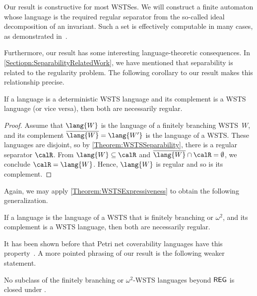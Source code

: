 \documentclass[../../diss.tex]{subfiles}
\begin{document}
Our result is constructive for most WSTSes.
We will construct a finite automaton whose language is the required regular separator from the so-called ideal decomposition of an invariant.
Such a set is effectively computable in many cases, as demonstrated \eg in~\cite{Finkel16,LazicS15}.

Furthermore, our result has some interesting language-theoretic consequences.
In \cref{Sectiopn:SeparabilityRelatedWork}, we have mentioned that separability is related to the regularity problem.
The following corollary to our result makes this relationship precise.

\begin{corollary}%
\label{Corollary:WSTSNecessarilyRegular}%
    If a language is a deterministic WSTS language and its complement is a WSTS language (or vice versa), then both are necessarily regular.
\end{corollary}

\begin{proof}
    Assume that $\lang{\wsts}$ is the language of a finitely branching WSTS~$W$, and its complement $\overline{\lang{\wsts}} = \lang{\wstsprime}$ is the language of a WSTS.\@
    These languages are disjoint, so by \cref{Theorem:WSTSSeparability}, there is a regular separator $\calR$.
    From $\lang{\wsts} \subseteq \calR$ and $\overline{\lang{\wsts}} \cap \calR = \emptyset$, we conclude $\calR = \lang{\wsts}$.
    Hence, $\lang{\wsts}$ is regular and so is its complement.
\end{proof}

Again, we may apply \cref{Theorem:WSTSExpressiveness} to obtain the following generalization.

\begin{corollary}
    \label{Corollary:WSTSNecessarilyRegular2}%
    If a language is the language of a WSTS that is finitely branching or $\omega^2$, and its complement is a WSTS language, then both are necessarily regular.
\end{corollary}

It has been shown before that Petri net coverability languages have this property~\cite{MukundKRS98,MukundKRS98b}.
A more pointed phrasing of our result is the following weaker statement.

\begin{corollary}%
\label{Corollary:WSTSSeparabilityClosedness}%
    No subclass of the finitely branching or $\omega^2$-WSTS languages beyond ${\mathsf{REG}}$ is closed under .
\end{corollary}
\end{document}

